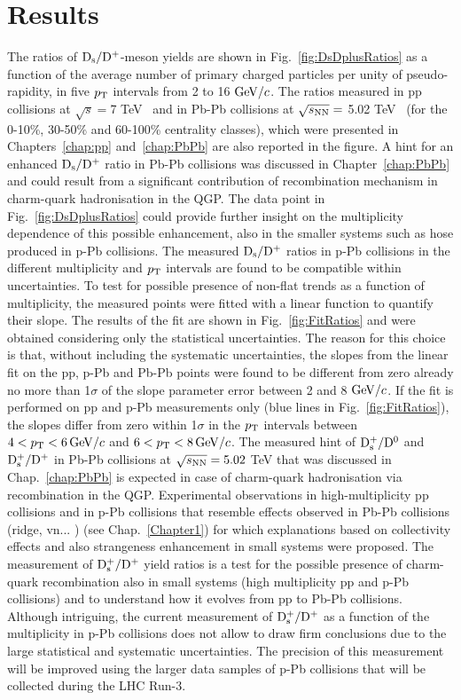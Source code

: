\section{Results}
\label{sec:results}
The ratios of ${\rm D_s}/{\rm D^+}$-meson yields are shown in Fig.~\ref{fig:DsDplusRatios} as a function of
the average number of primary charged particles per unity of pseudo-rapidity, 
in five $p_{\rm T}$ intervals from 2 to 16 $\mathrm{GeV}/c$.
The ratios measured in pp collisions at $\sqrt{s}=$7 TeV~\cite{Acharya:2017jgo} and 
in Pb-Pb collisions at $\sqrt{s_{\rm NN}}=$ 5.02 TeV~\cite{ALICE-PUBLIC-2017-003}
(for the 0-10\%, 30-50\% and 60-100\% centrality classes), which were presented in Chapters~\ref{chap:pp} and~\ref{chap:PbPb} 
are also reported in the figure.
A hint for an enhanced ${\rm D_s}/{\rm D^+}$ ratio in Pb-Pb collisions was discussed in Chapter~\ref{chap:PbPb} and could result
from a significant contribution of recombination mechanism in charm-quark hadronisation in the QGP.
The data point in Fig.~\ref{fig:DsDplusRatios} could provide further insight on the multiplicity 
dependence of this possible enhancement, also in the smaller systems such as hose produced
in p-Pb collisions. The measured ${\rm D_s}/{\rm D^+}$ ratios in p-Pb collisions in the different 
multiplicity and $p_{\rm T}$ intervals are found to be compatible within uncertainties. 
To test for possible presence of non-flat trends as a function of multiplicity, the measured points were 
fitted with a linear function to quantify their slope. The results of the fit are shown in Fig.~\ref{fig:FitRatios}
and were obtained considering only the statistical uncertainties. The reason for this choice is that, without including the
systematic uncertainties, the slopes from the linear fit on the pp, 
p-Pb and Pb-Pb points were found to be different from zero already no more than 
1$\sigma$ of the slope parameter error between 2 and 8 $\mathrm{GeV}/c$. 
If the fit is performed on pp and p-Pb measurements only (blue lines in Fig.~\ref{fig:FitRatios}), 
the slopes differ from zero within 1$\sigma$ 
in the $p_{\rm T}$ intervals between $4<p_{\rm T}<6 \, \mathrm{GeV}/c$ and $6<p_{\rm T}<8 \,\mathrm{GeV}/c$. 
The measured hint of ${\rm D_s^+}/{\rm D^0}$ and ${\rm D_s^+}/{\rm D^+}$ in Pb-Pb collisions at $\sqrt{s_{\rm NN}}=5.02$ TeV
that was discussed in Chap.~\ref{chap:PbPb} is expected in case of charm-quark hadronisation
via recombination in the QGP. Experimental observations in high-multiplicity pp collisions and in p-Pb collisions that resemble
effects observed in Pb-Pb collisions (ridge, vn... ) (see Chap.~\ref{Chapter1}) for which explanations
based on collectivity effects and also strangeness enhancement in small systems were proposed.
The measurement of ${\rm D_s^+}/{\rm D^+}$ yield ratios is a test for the possible presence of charm-quark recombination
also in small systems (high multiplicity pp and p-Pb collisions) and to understand how it evolves from
pp to Pb-Pb collisions. Although intriguing, the current measurement of ${\rm D_s^+}/{\rm D^+}$ as a function
of the multiplicity in p-Pb collisions does
not allow to draw firm conclusions due to the large statistical and systematic uncertainties.
The precision of this measurement will be improved using the 
larger data samples of p-Pb collisions that will be collected during the LHC Run-3.



